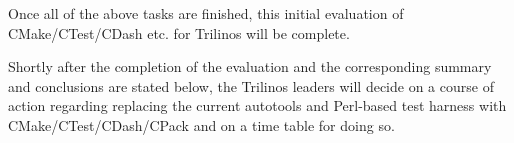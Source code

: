 Once all of the above tasks are finished, this initial evaluation of
CMake/CTest/CDash etc. for Trilinos will be complete.

Shortly after the completion of the evaluation and the corresponding
summary and conclusions are stated below, the Trilinos leaders will
decide on a course of action regarding replacing the current autotools
and Perl-based test harness with CMake/CTest/CDash/CPack and on a time
table for doing so.

